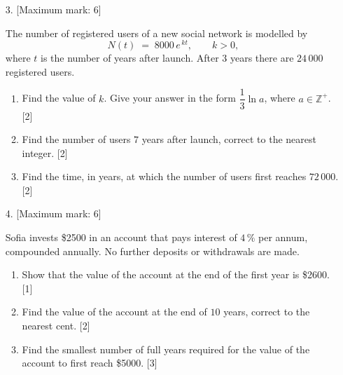 \documentclass[12pt, twoside]{article}
\begin{document}
\begin{enumerate}[itemsep=0.15cm]
Let $g(x) = 4 \cdot 2^{\,x - 1} - 3$.

\begin{enumerate}[itemsep=0.1cm]
  \item Write down the equation of the horizontal asymptote of
  $y = g(x)$. \hfill [1]
  \item Find $g(3)$. \hfill [2]
  \item Find an expression for $g^{-1}(x)$. \hfill [3]
\end{enumerate}


\newpage

\item[3.] [Maximum mark: 6]

The number of registered users of a new social network is modelled by
$$N(t) \;=\; 8000\, e^{\,k t}, \qquad k > 0,$$
where $t$ is the number of years after launch. After $3$ years there
are $24\,000$ registered users.

\begin{enumerate}[itemsep=0.1cm]
  \item Find the value of $k$. Give your answer in the form
  $\dfrac{1}{3}\ln a$, where $a \in \mathbb{Z}^{+}$. \hfill [2]
  \item Find the number of users $7$ years after launch, correct to
  the nearest integer. \hfill [2]
  \item Find the time, in years, at which the number of users first
  reaches $72\,000$. \hfill [2]
\end{enumerate}


\newpage

\item[4.] [Maximum mark: 6]

Sofia invests \$2500 in an account that pays interest of $4\,\%$ per
annum, compounded annually. No further deposits or withdrawals are
made.

\begin{enumerate}[itemsep=0.1cm]
  \item Show that the value of the account at the end of the first
  year is \$2600. \hfill [1]
  \item Find the value of the account at the end of $10$ years,
  correct to the nearest cent. \hfill [2]
  \item Find the smallest number of full years required for the value
  of the account to first reach \$5000. \hfill [3]
\end{enumerate}


\end{enumerate}
\end{document}
